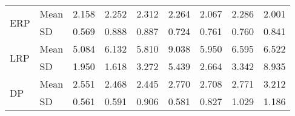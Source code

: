 \begin{longtable}{llrrrrrrr}
\cline{1-9}
\multirow{2}{*}{ERP} & Mean &      2.158 &      2.252 &      2.312 &      2.264 &      2.067 &      2.286 &      2.001 \\
   & SD &      0.569 &      0.888 &      0.887 &      0.724 &      0.761 &      0.760 &      0.841 \\
\cline{1-9}
\multirow{2}{*}{LRP} & Mean &      5.084 &      6.132 &      5.810 &      9.038 &      5.950 &      6.595 &      6.522 \\
   & SD &      1.950 &      1.618 &      3.272 &      5.439 &      2.664 &      3.342 &      8.935 \\
\cline{1-9}
\multirow{2}{*}{DP} & Mean &      2.551 &      2.468 &      2.445 &      2.770 &      2.708 &      2.771 &      3.212 \\
   & SD &      0.561 &      0.591 &      0.906 &      0.581 &      0.827 &      1.029 &      1.186 \\
\end{longtable}
